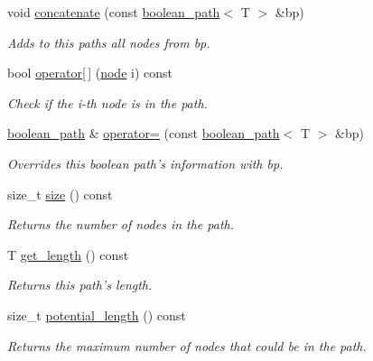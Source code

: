 \begin{DoxyCompactItemize}
void \hyperlink{classlgraph_1_1utils_1_1boolean__path_a005364eb88d63910a6e3965548d49197}{concatenate} (const \hyperlink{classlgraph_1_1utils_1_1boolean__path}{boolean\-\_\-path}$<$ T $>$ \&bp)
\begin{DoxyCompactList}\small\item\em Adds to this paths all nodes from bp. \end{DoxyCompactList}\item 
bool \hyperlink{classlgraph_1_1utils_1_1boolean__path_a9f0255a332cef8af3193fd683839d870}{operator\mbox{[}$\,$\mbox{]}} (\hyperlink{namespacelgraph_1_1utils_a7bd66ede3805ef121bc2835bd48de0cf}{node} i) const 
\begin{DoxyCompactList}\small\item\em Check if the i-\/th node is in the path. \end{DoxyCompactList}\item 
\hyperlink{classlgraph_1_1utils_1_1boolean__path}{boolean\-\_\-path} \& \hyperlink{classlgraph_1_1utils_1_1boolean__path_aedf4e03dbf45c2f66c79d01de5977ede}{operator=} (const \hyperlink{classlgraph_1_1utils_1_1boolean__path}{boolean\-\_\-path}$<$ T $>$ \&bp)
\begin{DoxyCompactList}\small\item\em Overrides this boolean path's information with {\itshape bp}. \end{DoxyCompactList}\item 
size\-\_\-t \hyperlink{classlgraph_1_1utils_1_1boolean__path_a783ac5583112896796549774fd9e66c2}{size} () const 
\begin{DoxyCompactList}\small\item\em Returns the number of nodes in the path. \end{DoxyCompactList}\item 
T \hyperlink{classlgraph_1_1utils_1_1boolean__path_a2707b0a596ca58e412b41e70d07ae055}{get\-\_\-length} () const 
\begin{DoxyCompactList}\small\item\em Returns this path's length. \end{DoxyCompactList}\item 
size\-\_\-t \hyperlink{classlgraph_1_1utils_1_1boolean__path_a572b365b3ab1232ca5d6f2fce4cd4519}{potential\-\_\-length} () const 
\begin{DoxyCompactList}\small\item\em Returns the maximum number of nodes that could be in the path. \end{DoxyCompactList}\item 

\end{DoxyCompactItemize}
